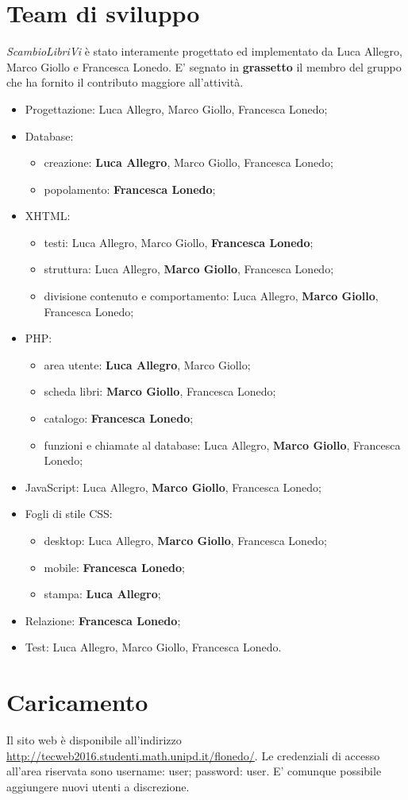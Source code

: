 \documentclass[openany,10pt,a4paper]{article}
\begin{document}
	\section{Team di sviluppo}
	\textit{ScambioLibriVi} è stato interamente progettato ed implementato da Luca Allegro, Marco Giollo e Francesca Lonedo. E' segnato in \textbf{grassetto} il membro del gruppo che ha fornito il contributo maggiore all'attività.
	\begin{itemize}
		\item Progettazione: Luca Allegro, Marco Giollo, Francesca Lonedo;
		\item Database: 
			\begin{itemize}
				\item creazione: \textbf{Luca Allegro}, Marco Giollo, Francesca Lonedo;
				\item popolamento: \textbf{Francesca Lonedo};
			\end{itemize}
		\item XHTML:
			\begin{itemize}
				\item testi: Luca Allegro, Marco Giollo, \textbf{Francesca Lonedo};
				\item struttura: Luca Allegro, \textbf{Marco Giollo}, Francesca Lonedo;
				\item divisione contenuto e comportamento: Luca Allegro, \textbf{Marco Giollo}, Francesca Lonedo;
			\end{itemize}
		\item PHP:
			\begin{itemize}
				\item area utente: \textbf{Luca Allegro}, Marco Giollo;
				\item scheda libri: \textbf{Marco Giollo}, Francesca Lonedo;
				\item catalogo: \textbf{Francesca Lonedo};
				\item funzioni e chiamate al database: Luca Allegro, \textbf{Marco Giollo}, Francesca Lonedo;
			\end{itemize}
		\item JavaScript: Luca Allegro, \textbf{Marco Giollo}, Francesca Lonedo;
		\item Fogli di stile CSS:
			\begin{itemize}
				\item desktop: Luca Allegro, \textbf{Marco Giollo}, Francesca Lonedo;
				\item mobile: \textbf{Francesca Lonedo};
				\item stampa: \textbf{Luca Allegro};
			\end{itemize}
		
		\item Relazione: \textbf{Francesca Lonedo};
		\item Test: Luca Allegro, Marco Giollo, Francesca Lonedo.
	\end{itemize}

\section{Caricamento}
	Il sito web è disponibile all'indirizzo \url{http://tecweb2016.studenti.math.unipd.it/flonedo/}. Le credenziali di accesso all'area riservata sono username: user; password: user. E' comunque possibile aggiungere nuovi utenti a discrezione.
\end{document}
